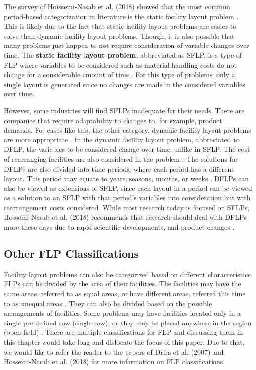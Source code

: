 The survey of Hoisseini-Nasab et al. (2018) showed that the most common period-based categorization in literature is the static facility layout problem \cite{Hosseini-Nasab2018}. This is likely due to the fact that static facility layout problems are easier to solve than dynamic facility layout problems. Though, it is also possible that many problems just happen to not require consideration of variable changes over time. The \textbf{static facility layout problem}, abbreviated as SFLP, is a type of FLP where variables to be considered such as material handling costs do not change for a considerable amount of time \cite{Perez-Gosende2020}. For this type of problems, only a single layout is generated since no changes are made in the considered variables over time.

However, some industries will find SFLPs inadequate for their needs. There are companies that require adaptability to changes to, for example, product demands. For cases like this, the other category, dynamic facility layout problems are more appropriate \cite{DerakhshanAsl2017}. In the dynamic facility layout problem, abbreviated to DFLP, the variables to be considered change over time, unlike in SFLP. The cost of rearranging facilities are also considered in the problem \cite{Hosseini2016}. The solutions for DFLPs are also divided into time periods, where each period has a different layout. This period may equate to years, seasons, months, or weeks \cite{DerakhshanAsl2017}. DFLPs can also be viewed as extensions of SFLP, since each layout in a period can be viewed as a solution to an SFLP with that period's variables into consideration but with rearrangement costs considered. While most research today is focused on SFLPs, Hosseini-Nasab et al. (2018) recommends that research should deal with DFLPs more these days due to rapid scientific developments, and product changes \cite{Hosseini-Nasab2018}.

\subsection{Other FLP Classifications}
Facility layout problems can also be categorized based on different characteristics. FLPs can be divided by the area of their facilities. The facilities may have the same areas, referred to as equal areas, or have different areas, referred this time to as unequal areas \cite{DerakhshanAsl2017}. They can also be divided based on the possible arrangements of facilities. Some problems may have facilities located only in a single pre-defined row (single-row), or they may be placed anywhere in the region (open field) \cite{Drira2007}. There are multiple classifications for FLP and discussing them in this chapter would take long and dislocate the focus of this paper. Due to that, we would like to refer the reader to the papers of Drira et al. (2007) \cite{Drira} and Hosseini-Nasab et al. (2018) \cite{Hosseini-Nasab2018} for more information on FLP classifications.

